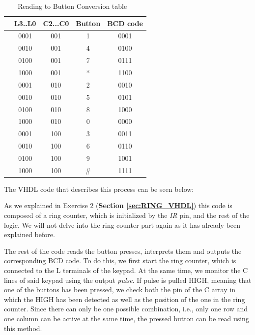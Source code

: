 \begin{table}[H]
    \centering
        \begin{tabular}[t]{lcccc}
            \toprule
            &\textbf{L3..L0}&\textbf{C2...C0}&\textbf{Button}&\textbf{BCD code}\\
            \midrule
                &    0001   & 001     & 1      & 0001     \\
                &    0010   & 001     & 4      & 0100     \\
                &    0100   & 001     & 7      & 0111     \\
                &    1000   & 001     & *      & 1100     \\
                &    0001   & 010     & 2      & 0010     \\
                &    0010   & 010     & 5      & 0101     \\
                &    0100   & 010     & 8      & 1000     \\
                &    1000   & 010     & 0      & 0000     \\
                &    0001   & 100     & 3      & 0011     \\
                &    0010   & 100     & 6      & 0110     \\
                &    0100   & 100     & 9      & 1001     \\
                &    1000   & 100     & \#     & 1111     \\
            \bottomrule
        \end{tabular}
        \caption{Reading to Button Conversion table ~\autocite{SLIDES_5}}
        \label{table: KEYPAD_TABLE}
\end{table}


The VHDL code that describes this process can be seen below:


As we explained in Exercise 2 (\textbf{Section \ref{sec:RING_VHDL}}) this code is composed of a ring counter, which is initialized by the \textit{IR} pin, and the rest of the logic. We will not delve into the ring counter part again as it has already been explained before. \medskip

\clearpage

The rest of the code reads the button presses, interprets them and outputs the corresponding BCD code. To do this, we first start the ring counter, which is connected to the L terminals of the keypad. At the same time, we monitor the C lines of said keypad using the output \textit{pulse}. If pulse is pulled HIGH, meaning that one of the buttons has been pressed, we check both the pin of the C array in which the HIGH has been detected as well as the position of the one in the ring counter. Since there can only be one possible combination, i.e., only one row and one column can be active at the same time, the pressed button can be read using this method.\medskip

